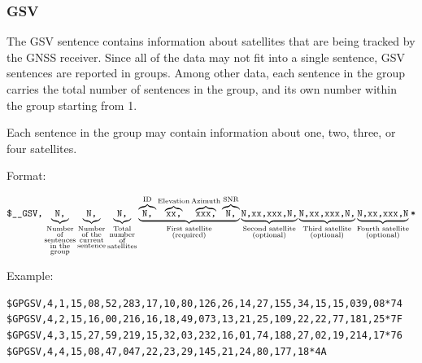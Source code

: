 \documentclass{zubaxdoc}
\begin{document}
\subsubsection{GSV}\label{sec:nmea_sentence_GSV}

The GSV sentence contains information about satellites that are being tracked by the GNSS receiver.
Since all of the data may not fit into a single sentence,
GSV sentences are reported in groups.
Among other data,
each sentence in the group carries the total number of sentences in the group,
and its own number within the group starting from 1.

Each sentence in the group may contain information about one, two, three, or four satellites.

Format:

$\texttt{\$\_\_GSV,}%
\underbrace{\texttt{N,}}_{\substack{\text{Number} \\ \text{of} \\ \text{sentences} \\ \text{in the} \\ \text{group}}}%
\underbrace{\texttt{N,}}_{\substack{\text{Number} \\ \text{of the} \\ \text{current} \\ \text{sentence}}}%
\underbrace{\texttt{N,}}_{\substack{\text{Total} \\ \text{number} \\ \text{of} \\ \text{satellites}}}%
\underbrace{%
    \overbrace{\texttt{N,}}^{\text{ID}}%
    \overbrace{\texttt{xx,}}^{\text{Elevation}}%
    \overbrace{\texttt{xxx,}}^{\text{Azimuth}}%
    \overbrace{\texttt{N,}}^{\text{SNR}}%
}_{\substack{\text{First satellite} \\ \text{(required)}}}%
\underbrace{\texttt{N,xx,xxx,N,}}_{\substack{\text{Second satellite} \\ \text{(optional)}}}%
\underbrace{\texttt{N,xx,xxx,N,}}_{\substack{\text{Third satellite}  \\ \text{(optional)}}}%
\underbrace{\texttt{N,xx,xxx,N}}_{\substack{\text{Fourth satellite}  \\ \text{(optional)}}}%
\texttt{\text{*}}$

Example:
\begin{verbatim}
$GPGSV,4,1,15,08,52,283,17,10,80,126,26,14,27,155,34,15,15,039,08*74
$GPGSV,4,2,15,16,00,216,16,18,49,073,13,21,25,109,22,22,77,181,25*7F
$GPGSV,4,3,15,27,59,219,15,32,03,232,16,01,74,188,27,02,19,214,17*76
$GPGSV,4,4,15,08,47,047,22,23,29,145,21,24,80,177,18*4A
\end{verbatim}
\end{document}
